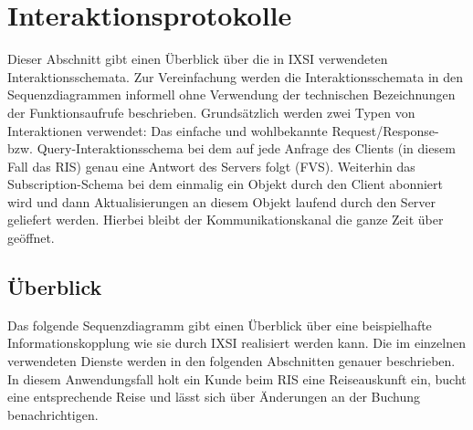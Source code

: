 \chapter{Interaktionsprotokolle}
\label{cha:Interaktionsprotokolle}
Dieser Abschnitt gibt einen Überblick über die in IXSI verwendeten Interaktionsschemata. Zur Vereinfachung werden die Interaktionsschemata in den Sequenzdiagrammen informell ohne Verwendung der technischen Bezeichnungen der Funktionsaufrufe beschrieben. Grundsätzlich werden zwei Typen von Interaktionen verwendet: Das einfache und wohlbekannte Request/Response- bzw. Query-Interaktionsschema bei dem auf jede Anfrage des Clients (in diesem Fall das RIS) genau eine Antwort des Servers folgt (FVS). Weiterhin das Subscription-Schema bei dem einmalig ein Objekt durch den Client abonniert wird und dann Aktualisierungen an diesem Objekt laufend durch den Server geliefert werden. Hierbei bleibt der Kommunikationskanal die ganze Zeit über geöffnet.


\section{Überblick}
Das folgende Sequenzdiagramm gibt einen Überblick über eine beispielhafte Informationskopplung wie sie durch IXSI realisiert werden kann. Die im einzelnen verwendeten Dienste werden in den folgenden Abschnitten genauer beschrieben. In diesem Anwendungsfall holt ein Kunde beim RIS eine Reiseauskunft ein, bucht eine entsprechende Reise und lässt sich über Änderungen an der Buchung benachrichtigen.

